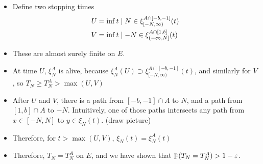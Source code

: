 \documentclass{beamer}
\newcommand{\ep}{\varepsilon}
\newcommand{\ignore}[1]{}
\newcommand{\rb}{\ignore{[}]}
\begin{document}
\begin{frame}
  \begin{itemize}
    \item Define two stopping times
    \begin{align*}
      U &= \inf{t \st N \in \xi_{[-N,\infty)}^{A \cap [-b,-1]}(t)} \\
      V &= \inf{t \st -N \in \xi_{(-\infty,N\rb}^{A \cap [1,b]}(t)} \\
    \end{align*}
    \item These are almost surely finite on $E$.
    \item At time $U$, $\xi_{N}^{A}$ is alive, because $\xi_{N}^{A}(U) \supset \xi_{[-N,\infty)}^{A \cap [-b,-1]}(t)$, and similarly for $V$, so $T_{N} \geq T_{N}^{A} > \max(U,V)$
  \end{itemize}
\end{frame}

\begin{frame}
  \begin{itemize}
    \item After $U$ and $V$, there is a path from $[-b,-1] \cap A$ to $N$, and a path from $[1,b] \cap A$ to $-N$. Intuitively, one of those paths intersects any path from $x \in [-N,N]$ to $y \in \xi_{N}(t)$. (draw picture)
    \item Therefore, for $t > \max(U,V)$, $\xi_{N}(t) = \xi_{N}^{A}(t)$
    \item Therefore, $T_{N} = T_{N}^{A}$ on $E$, and we have shown that $\Prob(T_{N} = T_{N}^{A}) > 1 - \ep$.
  \end{itemize}
\end{frame}
\end{document}
